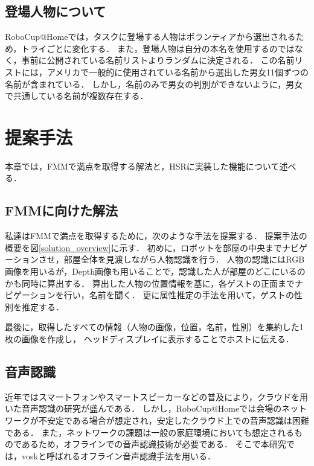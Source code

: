 \documentclass[a4j]{jarticle}
\begin{document}
\subsection{登場人物について}
\label{about_name_list}
RoboCup@Homeでは，タスクに登場する人物はボランティアから選出されるため，トライごとに変化する．
また，登場人物は自分の本名を使用するのではなく，事前に公開されている名前リストよりランダムに決定される．
この名前リストには，アメリカで一般的に使用されている名前から選出した男女11個ずつの名前が含まれている．
しかし，名前のみで男女の判別ができないように，男女で共通している名前が複数存在する．


\section{提案手法}
本章では，FMMで満点を取得する解法と，HSRに実装した機能について述べる．

\subsection{FMMに向けた解法}
私達はFMMで満点を取得するために，次のような手法を提案する．
提案手法の概要を図\ref{solution_overview}に示す．
初めに，ロボットを部屋の中央までナビゲーションさせ，部屋全体を見渡しながら人物認識を行う．
人物の認識にはRGB画像を用いるが，Depth画像も用いることで，認識した人が部屋のどこにいるのかも同時に算出する．
算出した人物の位置情報を基に，各ゲストの正面までナビゲーションを行い，名前を聞く．
更に属性推定の手法を用いて，ゲストの性別を推定する．

最後に，取得したすべての情報（人物の画像，位置，名前，性別）を集約した1枚の画像を作成し，
ヘッドディスプレイに表示することでホストに伝える．

\subsection{音声認識}
近年ではスマートフォンやスマートスピーカーなどの普及により，クラウドを用いた音声認識の研究が盛んである．
しかし，RoboCup@Homeでは会場のネットワークが不安定である場合が想定され，安定したクラウド上での音声認識は困難である．
また，ネットワークの課題は一般の家庭環境においても想定されるものであるため，オフラインでの音声認識技術が必要である．
そこで本研究では，vosk\cite{vosk_hp}と呼ばれるオフライン音声認識手法を用いる．
\end{document}
